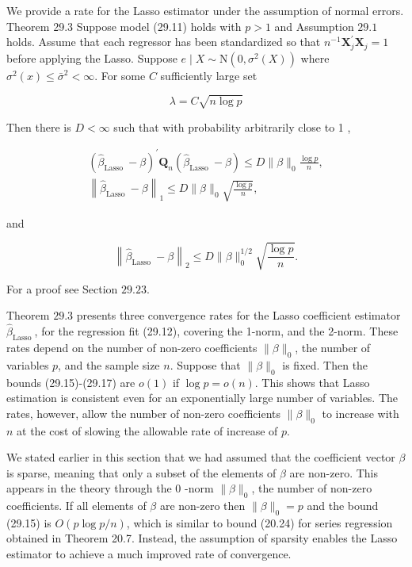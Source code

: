 \documentclass[10pt]{article}
\begin{document}
We provide a rate for the Lasso estimator under the assumption of normal errors. Theorem 29.3 Suppose model (29.11) holds with $p>1$ and Assumption $29.1$ holds. Assume that each regressor has been standardized so that $n^{-1} \boldsymbol{X}_{j}^{\prime} \boldsymbol{X}_{j}=1$ before applying the Lasso. Suppose $e \mid X \sim \mathrm{N}\left(0, \sigma^{2}(X)\right)$ where $\sigma^{2}(x) \leq \bar{\sigma}^{2}<\infty$. For some $C$ sufficiently large set

$$
\lambda=C \sqrt{n \log p}
$$

Then there is $D<\infty$ such that with probability arbitrarily close to 1 ,

$$
\begin{gathered}
\left(\widehat{\beta}_{\text {Lasso }}-\beta\right)^{\prime} \boldsymbol{Q}_{n}\left(\widehat{\beta}_{\text {Lasso }}-\beta\right) \leq D\|\beta\|_{0} \frac{\log p}{n}, \\
\left\|\widehat{\beta}_{\text {Lasso }}-\beta\right\|_{1} \leq D\|\beta\|_{0} \sqrt{\frac{\log p}{n}},
\end{gathered}
$$

and

$$
\left\|\widehat{\beta}_{\text {Lasso }}-\beta\right\|_{2} \leq D\|\beta\|_{0}^{1 / 2} \sqrt{\frac{\log p}{n}} .
$$

For a proof see Section $29.23$.

Theorem $29.3$ presents three convergence rates for the Lasso coefficient estimator $\widehat{\beta}_{\text {Lasso }}$, for the regression fit (29.12), covering the 1-norm, and the 2-norm. These rates depend on the number of non-zero coefficients $\|\beta\|_{0}$, the number of variables $p$, and the sample size $n$. Suppose that $\|\beta\|_{0}$ is fixed. Then the bounds (29.15)-(29.17) are $o(1)$ if $\log p=o(n)$. This shows that Lasso estimation is consistent even for an exponentially large number of variables. The rates, however, allow the number of non-zero coefficients $\|\beta\|_{0}$ to increase with $n$ at the cost of slowing the allowable rate of increase of $p$.

We stated earlier in this section that we had assumed that the coefficient vector $\beta$ is sparse, meaning that only a subset of the elements of $\beta$ are non-zero. This appears in the theory through the 0 -norm $\|\beta\|_{0}$, the number of non-zero coefficients. If all elements of $\beta$ are non-zero then $\|\beta\|_{0}=p$ and the bound (29.15) is $O(p \log p / n)$, which is similar to bound (20.24) for series regression obtained in Theorem 20.7. Instead, the assumption of sparsity enables the Lasso estimator to achieve a much improved rate of convergence.
\end{document}
